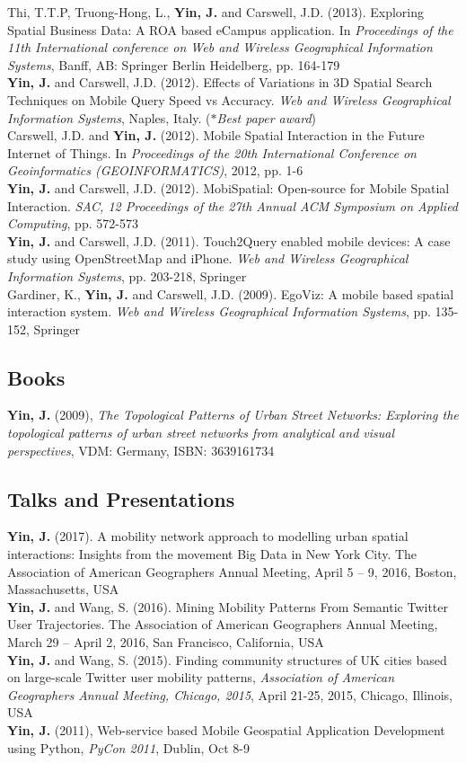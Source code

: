 \documentclass[11pt, a4paper]{article}
\newcommand{\years}[1]{\marginnote{\scriptsize #1}}
\begin{document}
\years{2013}Thi, T.T.P, Truong-Hong, L., \textbf{Yin, J.} and Carswell, J.D. (2013). Exploring Spatial Business Data: A ROA based eCampus application. In \textit{Proceedings of the 11th International conference on Web and Wireless Geographical Information Systems}, Banff, AB: Springer Berlin Heidelberg, pp. 164-179\\
\years{2012}\textbf{Yin, J.} and Carswell, J.D. (2012). Effects of Variations in 3D Spatial Search Techniques on Mobile Query Speed vs Accuracy. \textit{Web and Wireless Geographical Information Systems}, Naples, Italy. (\emph{$*$Best paper award})\\
\years{2012}Carswell, J.D. and \textbf{Yin, J.} (2012). Mobile Spatial Interaction in the Future Internet of Things. In \textit{Proceedings of the 20th International Conference on Geoinformatics (GEOINFORMATICS)}, 2012, pp. 1-6\\
\years{2012}\textbf{Yin, J.} and Carswell, J.D. (2012). MobiSpatial: Open-source for Mobile Spatial Interaction. \textit{SAC, 12 Proceedings of the 27th Annual ACM Symposium on Applied Computing}, pp. 572-573\\
\years{2012}\textbf{Yin, J.} and Carswell, J.D. (2011). Touch2Query enabled mobile devices: A case study using OpenStreetMap and iPhone. \textit{Web and Wireless Geographical Information Systems}, pp. 203-218, Springer\\
\years{2009} Gardiner, K., \textbf{Yin, J.} and Carswell, J.D. (2009). EgoViz: A mobile based spatial interaction system. \textit{Web and Wireless Geographical Information Systems}, pp. 135-152, Springer

\subsection*{Books}
\years{2009} \textbf{Yin, J.} (2009), \emph{The Topological Patterns of Urban Street Networks: Exploring the topological patterns of urban street networks from analytical and visual perspectives}, VDM: Germany, ISBN: 3639161734

\subsection*{Talks and Presentations}
\years{2017}\textbf{Yin, J.} (2017). A mobility network approach to modelling urban spatial interactions: Insights from the movement Big Data in New York City. The Association of American Geographers Annual Meeting, April 5 – 9, 2016, Boston, Massachusetts, USA\\
\years{2016}\textbf{Yin, J.} and Wang, S. (2016). Mining Mobility Patterns From Semantic Twitter User Trajectories. The Association of American Geographers Annual Meeting, March 29 – April 2, 2016, San Francisco, California, USA\\
\years{2015}\textbf{Yin, J.} and Wang, S. (2015). Finding community structures of UK cities based on large-scale Twitter user mobility patterns, \textit{Association of American Geographers Annual Meeting, Chicago, 2015}, April 21-25, 2015, Chicago, Illinois, USA\\
\years{2011} \textbf{Yin, J.} (2011), Web-service based Mobile Geospatial Application Development using Python, \textit{PyCon 2011}, Dublin, Oct 8-9
\end{document}
